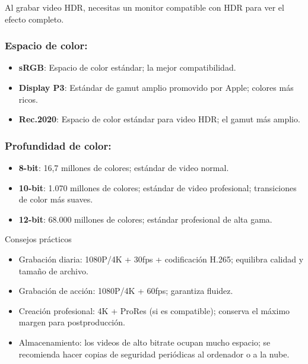 Al grabar video HDR, necesitas un monitor compatible con HDR para ver el efecto completo.


\subsubsection*{Espacio de color:}

\begin{itemize}
  \item \textbf{sRGB}: Espacio de color estándar; la mejor compatibilidad.
  \item \textbf{Display P3}: Estándar de gamut amplio promovido por Apple; colores más ricos.
  \item \textbf{Rec.2020}: Espacio de color estándar para video HDR; el gamut más amplio.
\end{itemize}

\subsubsection*{Profundidad de color:}

\begin{itemize}
  \item \textbf{8-bit}: 16,7 millones de colores; estándar de video normal.
  \item \textbf{10-bit}: 1.070 millones de colores; estándar de video profesional; transiciones de color más suaves.
  \item \textbf{12-bit}: 68.000 millones de colores; estándar profesional de alta gama.
\end{itemize}

\begin{tcbinfo}{Consejos prácticos}
\begin{itemize}
  \item Grabación diaria: 1080P/4K + 30fps + codificación H.265; equilibra calidad y tamaño de archivo.
  \item Grabación de acción: 1080P/4K + 60fps; garantiza fluidez.
  \item Creación profesional: 4K + ProRes (si es compatible); conserva el máximo margen para postproducción.
  \item Almacenamiento: los videos de alto bitrate ocupan mucho espacio; se recomienda hacer copias de seguridad periódicas al ordenador o a la nube.
\end{itemize}

\end{tcbinfo}

